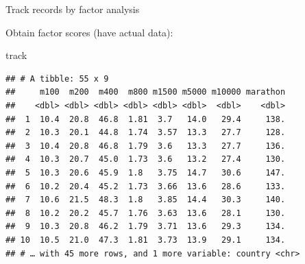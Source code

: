 \documentclass[ignorenonframetext,]{beamer}
\newenvironment{Shaded}{\begin{snugshade}}{\end{snugshade}}
\newcommand{\DataTypeTok}[1]{\textcolor[rgb]{0.13,0.29,0.53}{#1}}
\newcommand{\DecValTok}[1]{\textcolor[rgb]{0.00,0.00,0.81}{#1}}
\newcommand{\KeywordTok}[1]{\textcolor[rgb]{0.13,0.29,0.53}{\textbf{#1}}}
\newcommand{\NormalTok}[1]{#1}
\newcommand{\OperatorTok}[1]{\textcolor[rgb]{0.81,0.36,0.00}{\textbf{#1}}}
\newcommand{\StringTok}[1]{\textcolor[rgb]{0.31,0.60,0.02}{#1}}
\begin{document}
\begin{frame}[fragile]{Track records by factor analysis}
\protect\hypertarget{track-records-by-factor-analysis}{}

Obtain factor scores (have actual data):

\begin{Shaded}
\begin{Highlighting}[]
\NormalTok{track}
\end{Highlighting}
\end{Shaded}

\begin{verbatim}
## # A tibble: 55 x 9
##     m100  m200  m400  m800 m1500 m5000 m10000 marathon
##    <dbl> <dbl> <dbl> <dbl> <dbl> <dbl>  <dbl>    <dbl>
##  1  10.4  20.8  46.8  1.81  3.7   14.0   29.4     138.
##  2  10.3  20.1  44.8  1.74  3.57  13.3   27.7     128.
##  3  10.4  20.8  46.8  1.79  3.6   13.3   27.7     136.
##  4  10.3  20.7  45.0  1.73  3.6   13.2   27.4     130.
##  5  10.3  20.6  45.9  1.8   3.75  14.7   30.6     147.
##  6  10.2  20.4  45.2  1.73  3.66  13.6   28.6     133.
##  7  10.6  21.5  48.3  1.8   3.85  14.4   30.3     140.
##  8  10.2  20.2  45.7  1.76  3.63  13.6   28.1     130.
##  9  10.3  20.8  46.2  1.79  3.71  13.6   29.3     134.
## 10  10.5  21.0  47.3  1.81  3.73  13.9   29.1     134.
## # … with 45 more rows, and 1 more variable: country <chr>
\end{verbatim}

\begin{Shaded}
\end{Shaded}

\end{frame}
\end{document}

